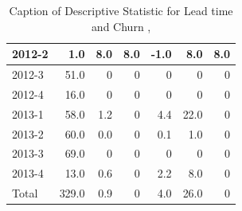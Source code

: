 \documentclass[UKenglish]{ifimaster}  %
\begin{document}
\begin{appendices}
\begin{table}[!htbp]
\begin{adjustwidth}{-1.5cm}{}
{{\begin{tabular}{ | l | r | r | r | r | r | r | }
2012-2 & 1.0 & 8.0 & 8.0 & -1.0 & 8.0 & 8.0\\ \hline
2012-3 & 51.0 & 0 & 0 & 0 & 0 & 0\\ \hline
2012-4 & 16.0 & 0 & 0 & 0 & 0 & 0\\ \hline
2013-1 & 58.0 & 1.2 & 0 & 4.4 & 22.0 & 0\\ \hline
2013-2 & 60.0 & 0.0 & 0 & 0.1 & 1.0 & 0\\ \hline
2013-3 & 69.0 & 0 & 0 & 0 & 0 & 0\\ \hline
2013-4 & 13.0 & 0.6 & 0 & 2.2 & 8.0 & 0\\ \hline
Total & 329.0 & 0.9 & 0 & 4.0 & 26.0 & 0\\ \hline

\end{tabular}
}
}
\end{adjustwidth}
\caption[Optional caption for list of figures]{Caption of Descriptive Statistic for Lead time and Churn  , }
\label{DS:8:3}
\end{table}


\end{appendices}
\end{document}
